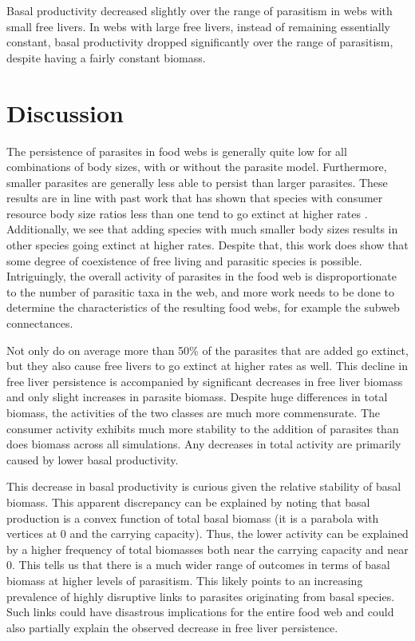 \documentclass[/home/nkappler/Research/Dissertation/dissertation.tex]{subfiles}
\begin{document}
\begin{bibunit}
Basal productivity decreased slightly over the range of parasitism in webs with
small free livers. In webs with large free livers, instead of remaining
essentially constant, basal productivity dropped significantly over the range
of parasitism, despite having a fairly constant biomass.
 
\section{Discussion}

The persistence of parasites in food webs is generally quite low for all
combinations of body sizes, with or without the parasite model. Furthermore,
smaller parasites are generally less able to persist than larger parasites.
These results are in line with past work that has shown that species with
consumer resource body size ratios less than one tend to go extinct at higher
rates \cite*{Brose2006b,Allesina2012}. Additionally, we see that adding species
with much smaller body sizes results in other species going extinct at higher
rates. Despite that, this work does show that some degree of coexistence of
free living and parasitic species is possible. Intriguingly, the overall
activity of parasites in the food web is disproportionate to the number of
parasitic taxa in the web, and more work needs to be done to determine the
characteristics of the resulting food webs, for example the subweb
connectances.

Not only do on average more than 50\% of the parasites that are added go
extinct, but they also cause free livers to go extinct at higher rates as well.
This decline in free liver persistence is accompanied by significant decreases
in free liver biomass and only slight increases in parasite biomass. Despite
huge differences in total biomass, the activities of the two classes are
much more commensurate. The consumer activity exhibits much more stability to
the addition of parasites than does biomass across all simulations. Any
decreases in total activity are primarily caused by lower basal productivity. 

This decrease in basal productivity is curious given the relative stability of
basal biomass. This apparent discrepancy can be explained by noting that basal
production is a convex function of total basal biomass (it is a parabola with
vertices at 0 and the carrying capacity). Thus, the lower activity can be
explained by a higher frequency of total biomasses both near the carrying
capacity and near 0. This tells us that there is a much wider range of outcomes
in terms of basal biomass at higher levels of parasitism. This likely points
to an increasing prevalence of highly disruptive links to parasites originating
from basal species. Such links could have disastrous implications for the
entire food web and could also partially explain the observed decrease in free
liver persistence.


\end{bibunit}
\end{document}
